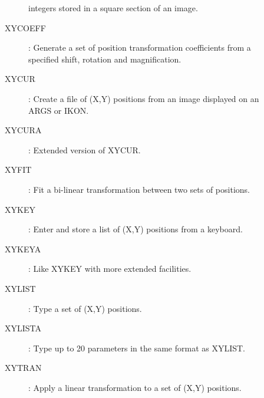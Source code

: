 \begin{description}
\begin{description}
integers stored in a square section of an image.
\item [XYCOEFF]: Generate a set of position transformation coefficients from a
specified shift, rotation and magnification.
\item [XYCUR]: Create a file of (X,Y) positions from an image displayed
on an ARGS or IKON.
\item [XYCURA]: Extended version of XYCUR.
\item [XYFIT]: Fit a bi-linear transformation between two sets of positions.
\item [XYKEY]: Enter and store a list of (X,Y) positions from a keyboard.
\item [XYKEYA]: Like XYKEY with more extended facilities.
\item [XYLIST]: Type a set of (X,Y) positions.
\item [XYLISTA]: Type up to 20 parameters in the same format as XYLIST.
\item [XYTRAN]: Apply a linear transformation to a set of (X,Y) positions.
\end{description}
\end{description}
